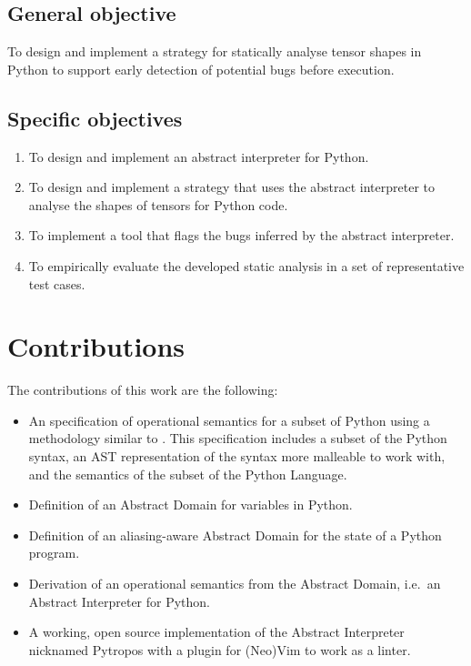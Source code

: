 \subsection{General objective}\label{general-objective}

To design and implement a strategy for statically analyse tensor shapes in Python to
support early detection of potential bugs before execution.

\subsection{Specific objectives}\label{specific-objectives}

\begin{enumerate}
\def\labelenumi{\arabic{enumi}.}
\tightlist
\item To design and implement an abstract interpreter for Python.
\item To design and implement a strategy that uses the abstract interpreter to analyse the
  shapes of tensors for Python code.
\item To implement a tool that flags the bugs inferred by the abstract interpreter.
\item To empirically evaluate the developed static analysis in a set of representative
  test cases.
\end{enumerate}

\section{Contributions}\label{contributions}

The contributions of this work are the following:

\begin{itemize}
\tightlist
\item An specification of operational semantics for a subset of Python using a methodology
  similar to \textcite{fromherz_static_2018}. This specification includes a subset of the
  Python syntax, an AST representation of the syntax more malleable to work with, and the
  semantics of the subset of the Python Language.
\item Definition of an Abstract Domain for variables in Python.
\item Definition of an aliasing-aware Abstract Domain for the state of a Python program.
\item Derivation of an operational semantics from the Abstract Domain, i.e.~an Abstract
  Interpreter for Python.
\item A working, open source implementation of the Abstract Interpreter nicknamed
  Pytropos\footnotemark{} with a plugin for (Neo)Vim to work as a linter.
\end{itemize}

